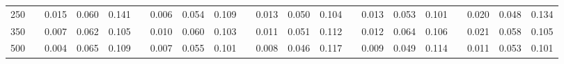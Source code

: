 % 
\begin{tabular}{ccccccccccccccccccccc}
  \hline
  \hline
250 &  & 0.015 & 0.060 & 0.141 &  & 0.006 & 0.054 & 0.109 &  & 0.013 & 0.050 & 0.104 &  & 0.013 & 0.053 & 0.101 &  & 0.020 & 0.048 & 0.134 \\ 
  350 &  & 0.007 & 0.062 & 0.105 &  & 0.010 & 0.060 & 0.103 &  & 0.011 & 0.051 & 0.112 &  & 0.012 & 0.064 & 0.106 &  & 0.021 & 0.058 & 0.105 \\ 
  500 &  & 0.004 & 0.065 & 0.109 &  & 0.007 & 0.055 & 0.101 &  & 0.008 & 0.046 & 0.117 &  & 0.009 & 0.049 & 0.114 &  & 0.011 & 0.053 & 0.101 \\ 
   \hline
\end{tabular}
